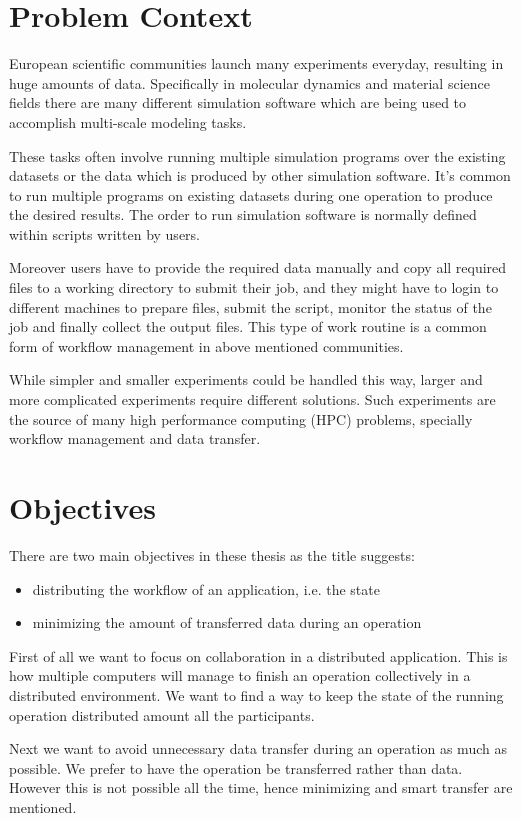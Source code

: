 \section{Problem Context}
European scientific communities launch many experiments everyday, resulting in huge amounts
of data. Specifically in molecular dynamics and material science fields there are many different
simulation software which are being used to accomplish multi-scale modeling tasks. 

These tasks often involve running multiple simulation programs over the existing datasets or the data which is
produced by other simulation software. It's common to run multiple programs on existing datasets
during one operation to produce the desired results. The order to run simulation software is normally 
defined within scripts written by users. 

Moreover users have to provide the required data manually and copy all required files to a working
directory to submit their job, and they might have to login to different machines to prepare files,
submit the script, monitor the status of the job and finally collect the output files. 
This type of work routine is a common form of workflow management in above mentioned communities.

While simpler and smaller experiments could be handled this way, larger and more complicated experiments
require different solutions. 
Such experiments are the source of many high performance computing (HPC) problems,
specially workflow management and data transfer.

\section{Objectives}
There are two main objectives in these thesis as the title suggests:
\begin{itemize}
\item distributing the workflow of an application, i.e. the state
\item minimizing the amount of transferred data during an operation
\end{itemize}

First of all we want to focus on collaboration in a distributed application.
This is how multiple computers will manage to finish an operation collectively in a distributed environment.
We want to find a way to keep the state of the running operation distributed amount all the participants.

Next we want to avoid unnecessary data transfer during an operation as much as possible.
We prefer to have the operation be transferred rather than data. 
However this is not possible all the time,
hence minimizing and smart transfer are mentioned.


